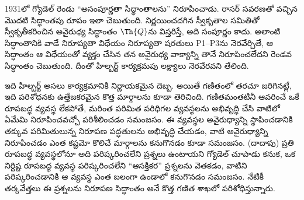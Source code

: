\documentclass[../../../include/open-logic-section]{subfiles}
\begin{document}
1931లో గ్యోడెల్ రెండు ``అసంపూర్ణతా సిద్ధాంతాలను'' నిరూపించాడు. రాసర్ సవరణతో
వచ్చిన మొదటి సిద్ధాంతపు రూపం ఇలా చెబుతుంది. నిర్ణయించదగిన స్వీకృతాల సమితితో
స్వీకృతీకరించిన అవైరుధ్య సిద్ధాంతం $\Th{Q}$ను విస్తరిస్తే, అది సంపూర్ణం కాదు.
అలాంటి సిద్ధాంతానికి వాడే నిరూప్యతా విధేయం నిరూప్యతా షరతులు P1--P3ను
నెరవేర్చితే, ఆ సిద్ధాంతం ఆ విధేయంతో వ్యక్తం చేసిన తన అవైరుధ్య వాక్యాన్ని తానే
నిరూపించలేదని రెండవ సిద్ధాంతం చెబుతుంది. దీంతో హిల్బర్ట్ కార్యక్రమపు
లక్ష్యాలు నెరవేరవని తేలింది.

ఇది హిల్బర్ట్ అసలు కార్యక్రమానికి నిర్ణాయకమైన దెబ్బ. అయితే గణితంలో తరచూ
జరిగినట్లే, ఇది పరిశోధనకు ఉత్తేజకరమైన కొత్త మార్గాలను కూడా తెరిచింది. గణితమంతటినీ
ఆవరించే ఒకే రూపబద్ధ వ్యవస్థ లేకపోతే, మరింత పరిమిత పరిధిగల వ్యవస్థలను అభివృద్ధి
చేసి వాటిలో ఏమేమి నిరూపించవచ్చో పరిశీలించడం సమంజసం. ఈ వ్యవస్థల అవైరుధ్యాన్ని
స్థాపించడానికి తక్కువ పరిమితులున్న నిరూపణ పద్ధతులను అభివృద్ధి చేయడం, వాటి అవైరుధ్యాన్ని
నిరూపించడం ఎంత కష్టమో కొలిచే మార్గాలను కనుగొనడం కూడా సమంజసం. (దాదాపు) ప్రతి
రూపబద్ధ వ్యవస్థలోనూ అది పరిష్కరించలేని ప్రశ్నలు ఉంటాయని గ్యోడెల్ చూపాడు కనుక,
ఒక నిర్దిష్ట రూపబద్ధ వ్యవస్థ పరిష్కరించలేని ``ఆసక్తికర'' ప్రశ్నలను వెతకడం,
వాటిని పరిష్కరించడానికి ఆ వ్యవస్థ ఎంత బలంగా ఉండాలో కనుగొనడం సమంజసం. నేటికీ
తర్కవేత్తలు ఈ ప్రశ్నలను నిరూపణ సిద్ధాంతం అనే కొత్త గణిత శాఖలో పరిశోధిస్తున్నారు.
\end{document}
